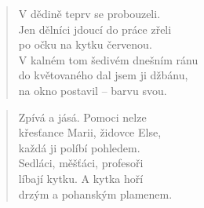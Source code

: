 \documentclass{book}
\begin{document}
\begin{verse}
V dědině teprv se probouzeli.\\
Jen dělníci jdoucí do práce zřeli\\
po očku na kytku červenou.\\
V kalném tom šedivém dnešním ránu\\
do květovaného dal jsem ji džbánu,\\
na okno postavil -- barvu svou.
\end{verse}
\begin{verse}
Zpívá a jásá. Pomoci nelze\\
křesťance Marii, židovce Else,\\
každá ji políbí pohledem.\\
Sedláci, měšťáci, profesoři\\
líbají kytku. A kytka hoří\\
drzým a pohanským plamenem.
\end{verse}
\end{document}

